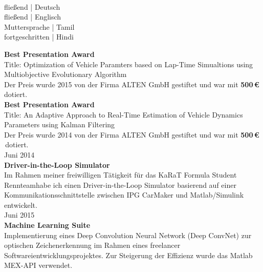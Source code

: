 \documentclass{mycv}
\begin{document}
\begin{paracol}{2}
	\begin{onehalfspace}
		\hspace{0mm}\\
	\begin{minipage}{0.37\textwidth}
		{\mybox\mybox\mybox\mybox\mybox \hfill flie{\ss}end | Deutsch}\\
		{\mybox\mybox\mybox\mybox\mybox \hfill flie{\ss}end | Englisch}\\
		{\mybox\mybox\mybox\mybox\mybox \hfill Muttersprache | Tamil}\\
    {\mybox\mybox\mybox\myboxo\myboxo \hfill fortgeschritten | Hindi}\\
	\end{minipage}
	\end{onehalfspace}

	{\RaggedLeft \bfseries Best Presentation Award\\}
	{Title}: Optimization of Vehicle Paramters based on Lap-Time
	Simualtions using Multiobjective Evolutionary Algorithm\\
	{\footnotesize Der Preis wurde 2015 von der Firma ALTEN GmbH gestiftet und
		war mit {\bfseries500\,\euro{}} dotiert.}\\

	{\RaggedLeft \bfseries Best Presentation Award\\}
	{Title}: An Adaptive Approach to Real-Time Estimation of
	Vehicle Dynamics Parameters using Kalman Filtering\\
	{\footnotesize Der Preis wurde 2014 von der Firma ALTEN GmbH gestiftet und
		war mit {\bfseries500\,\euro{}} \,dotiert.}\\

	{\RaggedLeft Juni 2014\\ \bfseries Driver-in-the-Loop Simulator\\}
	Im Rahmen meiner freiwilligen T{\"a}tigkeit f{\"u}r das KaRaT Formula Student
	Rennteamhabe ich einen Driver-in-the-Loop Simulator basierend auf einer
	Kommunikationsschnittstelle zwischen IPG CarMaker und Matlab/Simulink
	entwickelt.\\

	{\RaggedLeft Juni 2015\\ \bfseries Machine Learning Suite\\}
	Implementierung eines Deep Convolution Neural Network (Deep ConvNet) zur
	optischen Zeichenerkennung im Rahmen eines freelancer
	Softwareientwicklungsprojektes. Zur Steigerung der Effizienz wurde das
	Matlab MEX-API verwendet.\\


\end{paracol}
\end{document}
